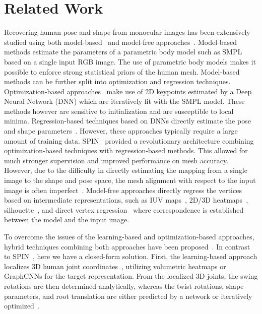 \documentclass[10pt,twocolumn,letterpaper]{article}
\begin{document}
 



\section{Related Work}
Recovering human pose and shape from monocular images has been extensively studied using both model-based~\cite{hmr,pare,romp} and model-free approaches~\cite{i2l,meshgraph,densepose}.  Model-based methods estimate the parameters of a parametric body model such as SMPL~\cite{smpl} based on a single input RGB image. The use of parametric body models makes it possible to enforce strong statistical priors of the human mesh. Model-based methods can be further split into optimization and regression techniques. Optimization-based approaches~\cite{bogo2016keep,mirror} make use of 2D keypoints estimated by a Deep Neural Network (DNN) which are iteratively fit with the SMPL model. These methods however are sensitive to initialization and are susceptible to local minima.
Regression-based techniques based on DNNs directly estimate the pose and shape parameters~\cite{hmr, guler2019holopose,omran2018neural,pavlakos2018learning,tung2017self,romp}. However, these approaches typically require a large amount of training data. SPIN~\cite{spin} provided a revolutionary architecture combining optimization-based techniques with regression-based methods. This allowed for much stronger supervision and improved performance on mesh accuracy. However, due to the difficulty in directly estimating the mapping from a single image to the shape and pose space, the mesh alignment with respect to the input image is often imperfect~\cite{hybrik,kama}. Model-free approaches directly regress the vertices based on intermediate representations, such as IUV maps~\cite{densepose,denserac,decomr}, 2D/3D heatmaps~\cite{kama,hybrik}, silhouette~\cite{straps,lasor}, and direct vertex regression~\cite{i2l,meshgraph,gcmr,l21end} where correspondence is established between the model and the input image. 

To overcome the issues of the learning-based and optimization-based approaches, hybrid techniques combining both approaches have been proposed~\cite{hybrik,llr,hkmr,kama}. In contrast to SPIN~\cite{spin}, here we have a closed-form solution. First, the learning-based approach localizes 3D human joint coordinates~\cite{rootnet,choi2022learning,Iqbal2020WeaklySupervised3H,p2m}, utilizing volumetric heatmaps or GraphCNNs for the target representation.
From the localized 3D joints, the swing rotations are then determined analytically, whereas the twist rotations, shape parameters, and root translation are either predicted by a network or iteratively optimized~\cite{hybrik,kama}.
\end{document}
